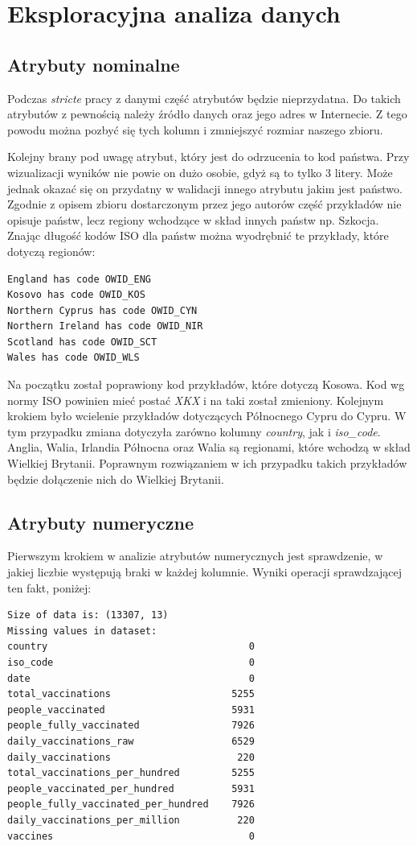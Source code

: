 \documentclass[12pt, oneside, openany]{article}
\begin{document}
\section{Eksploracyjna analiza danych}


\subsection{Atrybuty nominalne}

Podczas \textit{stricte} pracy z danymi część atrybutów będzie nieprzydatna. Do takich atrybutów z pewnością należy źródło danych oraz jego adres w Internecie. Z tego powodu można pozbyć się tych kolumn i zmniejszyć rozmiar naszego zbioru.

Kolejny brany pod uwagę atrybut, który jest do odrzucenia to kod państwa. Przy wizualizacji wyników nie powie on dużo osobie, gdyż są to tylko 3 litery. Może jednak okazać się on przydatny w walidacji innego atrybutu jakim jest państwo. Zgodnie z opisem zbioru dostarczonym przez jego autorów część przykładów nie opisuje państw, lecz regiony wchodzące w skład innych państw np. Szkocja. Znając długość kodów ISO dla państw można wyodrębnić te przykłady, które dotyczą regionów:
\begin{verbatim}
England has code OWID_ENG
Kosovo has code OWID_KOS
Northern Cyprus has code OWID_CYN
Northern Ireland has code OWID_NIR
Scotland has code OWID_SCT
Wales has code OWID_WLS
\end{verbatim}

Na początku został poprawiony kod przykładów, które dotyczą Kosowa. Kod wg normy ISO powinien mieć postać \textit{XKX} i na taki został zmieniony. Kolejnym krokiem było wcielenie przykładów dotyczących Północnego Cypru do Cypru. W tym przypadku zmiana dotyczyła zarówno kolumny \textit{country}, jak i \textit{iso\_code}. Anglia, Walia, Irlandia Północna oraz Walia są regionami, które wchodzą w skład Wielkiej Brytanii. Poprawnym rozwiązaniem w ich przypadku takich przykładów będzie dołączenie nich do Wielkiej Brytanii.

\subsection{Atrybuty numeryczne}

Pierwszym krokiem w analizie atrybutów numerycznych jest sprawdzenie, w jakiej liczbie występują braki w każdej kolumnie. Wyniki operacji sprawdzającej ten fakt, poniżej:

\begin{verbatim}
Size of data is: (13307, 13)
Missing values in dataset: 
country                                   0
iso_code                                  0
date                                      0
total_vaccinations                     5255
people_vaccinated                      5931
people_fully_vaccinated                7926
daily_vaccinations_raw                 6529
daily_vaccinations                      220
total_vaccinations_per_hundred         5255
people_vaccinated_per_hundred          5931
people_fully_vaccinated_per_hundred    7926
daily_vaccinations_per_million          220
vaccines                                  0
\end{verbatim}
\end{document}
